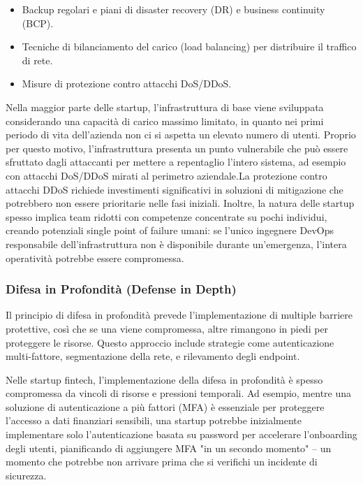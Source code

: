 \documentclass[a4paper,12pt]{report}
\begin{document}
\begin{itemize}
\begin{itemize}
        \item Backup regolari e piani di disaster recovery (DR) e business continuity (BCP).
        \item Tecniche di bilanciamento del carico (load balancing) per distribuire il traffico di rete.
        \item Misure di protezione contro attacchi DoS/DDoS.
    \end{itemize}
    Nella maggior parte delle startup, l'infrastruttura di base viene sviluppata considerando una capacità di carico massimo limitato, in quanto nei primi periodo di vita dell'azienda non ci si aspetta un elevato numero di utenti. Proprio per questo motivo, l'infrastruttura presenta un punto vulnerabile che può essere sfruttato dagli attaccanti per mettere a repentaglio l'intero sistema, ad esempio con attacchi DoS/DDoS mirati al perimetro aziendale.La protezione contro attacchi DDoS richiede investimenti significativi in soluzioni di mitigazione che potrebbero non essere prioritarie nelle fasi iniziali. Inoltre, la natura delle startup spesso implica team ridotti con competenze concentrate su pochi individui, creando potenziali single point of failure umani: se l'unico ingegnere DevOps responsabile dell'infrastruttura non è disponibile durante un'emergenza, l'intera operatività potrebbe essere compromessa. 
\end{itemize}

\subsubsection{Difesa in Profondità (Defense in Depth)}
Il principio di difesa in profondità prevede l'implementazione di multiple barriere protettive, così che se una viene compromessa, altre rimangono in piedi per proteggere le risorse. Questo approccio include strategie come autenticazione multi-fattore, segmentazione della rete, e rilevamento degli endpoint.

Nelle startup fintech, l'implementazione della difesa in profondità è spesso compromessa da vincoli di risorse e pressioni temporali. Ad esempio, mentre una soluzione di autenticazione a più fattori (MFA) è essenziale per proteggere l'accesso a dati finanziari sensibili, una startup potrebbe inizialmente implementare solo l'autenticazione basata su password per accelerare l'onboarding degli utenti, pianificando di aggiungere MFA "in un secondo momento" – un momento che potrebbe non arrivare prima che si verifichi un incidente di sicurezza.
\end{document}
